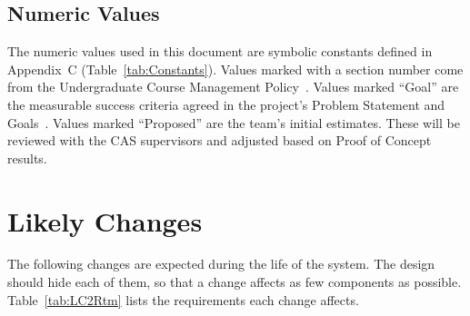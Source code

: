 \documentclass[12pt]{article}
\begin{document}
\subsection{Numeric Values}

The numeric values used in this document are symbolic constants defined in
Appendix~C (Table~\ref{tab:Constants}). Values marked with a section number come
from the Undergraduate Course Management Policy~\citep{McMasterUCMP2025}. Values marked ``Goal'' are the measurable success
criteria agreed in the project's Problem Statement and Goals~\citep{TeamBVSH2026PS}. Values marked
``Proposed'' are the team's initial estimates. These will be reviewed with the
CAS supervisors and adjusted based on Proof of Concept results.

\section{Likely Changes} \label{sec_LikelyChanges}

The following changes are expected during the life of the system. The design
should hide each of them, so that a change affects as few components as
possible. Table~\ref{tab:LC2Rtm} lists the requirements each change affects.
\end{document}
